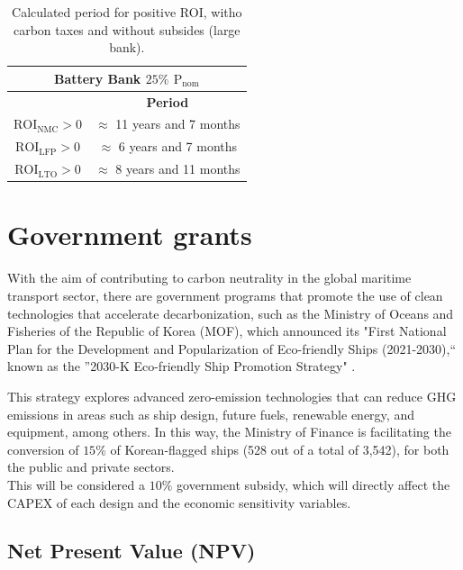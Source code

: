\begin{table}[H]
	\centering
	\caption{Calculated period for positive ROI, witho carbon taxes and without subsides (large bank).}
	\label{tab:roi2c}
	\begin{tabular}{|c|c|}
		\hline
		\multicolumn{2}{|c|}{Battery Bank $25\%$ ${\text{P}}_{\text{nom}}$} \\
		\hline\hline
		    & \textbf{Period}\\
		 \hline
	${\text{ROI}}_{\text{NMC}}>0$ & $\approx$ 11 years and 7 months \\
		 \hline
	${\text{ROI}}_{\text{LFP}}>0$ & $\approx$ 6 years and 7 months \\
		 \hline
 	${\text{ROI}}_{\text{LTO}}>0$ & $\approx$ 8 years and 11 months\\
		 \hline
	\end{tabular}
\end{table}

\section{Government grants}\label{sec:grant}
With the aim of contributing to carbon neutrality in the global maritime transport sector, there are government programs that promote the use of clean technologies that accelerate decarbonization, such as the Ministry of Oceans and Fisheries of the Republic of Korea (MOF), which announced its "First National Plan for the Development and Popularization of Eco-friendly Ships (2021-2030),“ known as the ”2030-K Eco-friendly Ship Promotion Strategy" \cite{mof}.

This strategy explores advanced zero-emission technologies that can reduce GHG emissions in areas such as ship design, future fuels, renewable energy, and equipment, among others. In this way, the Ministry of Finance is facilitating the conversion of $15\%$ of Korean-flagged ships (528 out of a total of 3,542), for both the public and private sectors.\\

This will be considered a $10\%$ government subsidy, which will directly affect the CAPEX of each design and the economic sensitivity variables.

\subsection{Net Present Value (NPV)}

